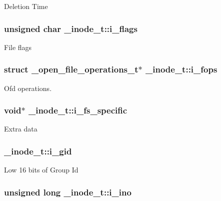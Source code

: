 Deletion Time \hypertarget{struct__inode__t_a36ff48a57a9e483d74682972d31ef46c}{
\subsubsection[{i\-\_\-flags}]{\setlength{\rightskip}{0pt plus 5cm}unsigned char \-\_\-inode\-\_\-t\-::i\-\_\-flags}}\label{struct__inode__t_a36ff48a57a9e483d74682972d31ef46c}
File flags \hypertarget{struct__inode__t_acf149d7d1601f78142b1eec480badf7e}{
\subsubsection[{i\-\_\-fops}]{\setlength{\rightskip}{0pt plus 5cm}struct {\bf \-\_\-open\-\_\-file\-\_\-operations\-\_\-t}$\ast$ \-\_\-inode\-\_\-t\-::i\-\_\-fops}}\label{struct__inode__t_acf149d7d1601f78142b1eec480badf7e}
Ofd operations. \hypertarget{struct__inode__t_a54e34439c448c46bae90fd040dadc5c0}{
\subsubsection[{i\-\_\-fs\-\_\-specific}]{\setlength{\rightskip}{0pt plus 5cm}void$\ast$ \-\_\-inode\-\_\-t\-::i\-\_\-fs\-\_\-specific}}\label{struct__inode__t_a54e34439c448c46bae90fd040dadc5c0}
Extra data \hypertarget{struct__inode__t_a95d052a6e9b1b1e4f6837fa0f33b393e}{
\subsubsection[{i\-\_\-gid}]{ \-\_\-inode\-\_\-t\-::i\-\_\-gid}}\label{struct__inode__t_a95d052a6e9b1b1e4f6837fa0f33b393e}
Low 16 bits of Group Id \hypertarget{struct__inode__t_aba602b843ba63a32ca3950dbaf7e959c}{
\subsubsection[{i\-\_\-ino}]{\setlength{\rightskip}{0pt plus 5cm}unsigned long \-\_\-inode\-\_\-t\-::i\-\_\-ino}}\label{struct__inode__t_aba602b843ba63a32ca3950dbaf7e959c}
